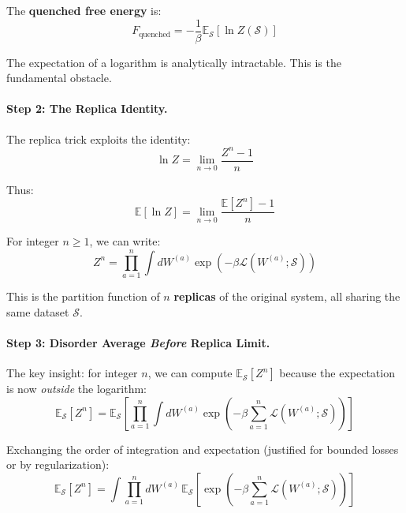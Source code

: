 \documentclass[
  journal=largetwo,
  simfonts=false,
  year=2025,
  volume=37,
]{cup-journal}
\begin{document}
The \textbf{quenched free energy} is:
\begin{equation}
    F_{\text{quenched}} = -\frac{1}{\beta} \mathbb{E}_{\mathcal{S}} \left[ \ln Z(\mathcal{S}) \right]
\end{equation}

The expectation of a logarithm is analytically intractable. This is the fundamental obstacle.

\paragraph{Step 2: The Replica Identity.}

The replica trick exploits the identity:
\begin{equation}
    \ln Z = \lim_{n \to 0} \frac{Z^n - 1}{n}
\end{equation}

Thus:
\begin{equation}\label{eq:replica_average}
    \mathbb{E}[\ln Z] = \lim_{n \to 0} \frac{\mathbb{E}[Z^n] - 1}{n}
\end{equation}

For integer $n \geq 1$, we can write:
\begin{equation}
    Z^n = \prod_{a=1}^{n} \int dW^{(a)} \exp\left( -\beta \mathcal{L}(W^{(a)}; \mathcal{S}) \right)
\end{equation}

This is the partition function of $n$ \textbf{replicas} of the original system, all sharing the same dataset $\mathcal{S}$.

\paragraph{Step 3: Disorder Average \textit{Before} Replica Limit.}

The key insight: for integer $n$, we can compute $\mathbb{E}_{\mathcal{S}}[Z^n]$ because the expectation is now \textit{outside} the logarithm:
\begin{equation}
    \mathbb{E}_{\mathcal{S}}[Z^n] = \mathbb{E}_{\mathcal{S}} \left[ \prod_{a=1}^{n} \int dW^{(a)} \exp\left( -\beta \sum_{a=1}^{n} \mathcal{L}(W^{(a)}; \mathcal{S}) \right) \right]
\end{equation}

Exchanging the order of integration and expectation (justified for bounded losses or by regularization):
\begin{equation}
    \mathbb{E}_{\mathcal{S}}[Z^n] = \int \prod_{a=1}^{n} dW^{(a)} \, \mathbb{E}_{\mathcal{S}} \left[ \exp\left( -\beta \sum_{a=1}^{n} \mathcal{L}(W^{(a)}; \mathcal{S}) \right) \right]
\end{equation}
\end{document}
